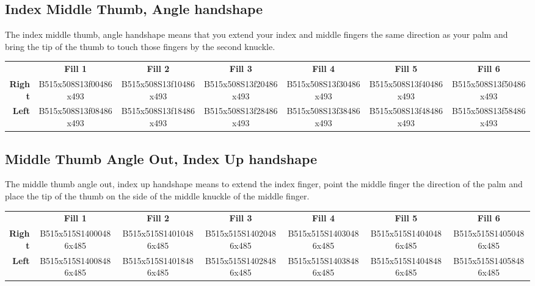 \documentclass{article}
\begin{document}
\subsection{Index Middle Thumb, Angle handshape}

The index middle thumb, angle handshape means that you extend your index and middle fingers the same direction as your palm and bring the tip of the thumb to touch those fingers by the second knuckle.

\begin{center}
\begin{tabular}{r*{6}{c}}
&\textbf{Fill 1}&\textbf{Fill 2}&\textbf{Fill 3}&\textbf{Fill 4}&\textbf{Fill 5}&\textbf{Fill 6}\\
\textbf{Right}&
B515x508S13f00486x493&
B515x508S13f10486x493&
B515x508S13f20486x493&
B515x508S13f30486x493&
B515x508S13f40486x493&
B515x508S13f50486x493\\
\textbf{Left}&
B515x508S13f08486x493&
B515x508S13f18486x493&
B515x508S13f28486x493&
B515x508S13f38486x493&
B515x508S13f48486x493&
B515x508S13f58486x493\\
\end{tabular}
\end{center}

\subsection{Middle Thumb Angle Out, Index Up handshape}

The middle thumb angle out, index up handshape means to extend the index finger, point the middle finger the direction of the palm and place the tip of the thumb on the side of the middle knuckle of the middle finger.

\begin{center}
\begin{tabular}{r*{6}{c}}
&\textbf{Fill 1}&\textbf{Fill 2}&\textbf{Fill 3}&\textbf{Fill 4}&\textbf{Fill 5}&\textbf{Fill 6}\\
\textbf{Right}&
B515x515S14000486x485&
B515x515S14010486x485&
B515x515S14020486x485&
B515x515S14030486x485&
B515x515S14040486x485&
B515x515S14050486x485\\
\textbf{Left}&
B515x515S14008486x485&
B515x515S14018486x485&
B515x515S14028486x485&
B515x515S14038486x485&
B515x515S14048486x485&
B515x515S14058486x485\\
\end{tabular}
\end{center}
\end{document}
